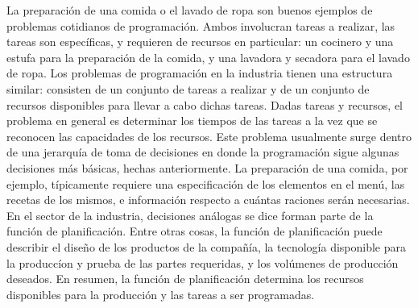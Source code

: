 \documentclass[draft,12pt,headsepline,footsepline,paper=letter]{scrreprt}
\begin{document}
La preparación de una comida o el lavado de ropa son buenos ejemplos de problemas cotidianos de programación. Ambos involucran tareas a realizar, las tareas son específicas, y requieren de recursos en particular: un cocinero y una estufa para la preparación de la comida, y una lavadora y secadora para el lavado de ropa.
Los problemas de programación en la industria tienen una estructura similar: consisten de un conjunto de tareas a realizar y de un conjunto de recursos disponibles para llevar a cabo dichas tareas. Dadas tareas y recursos, el problema en general es determinar los tiempos de las tareas a la vez que se reconocen las capacidades de los recursos.
Este problema usualmente surge dentro de una jerarquía de toma de decisiones en donde la programación sigue algunas decisiones más básicas, hechas anteriormente. La preparación de una comida, por ejemplo, típicamente requiere una especificación de los elementos en el menú, las recetas de los mismos, e información respecto a cuántas raciones serán necesarias. En el sector de la industria, decisiones análogas se dice forman parte de la función de planificación. Entre otras cosas, la función de planificación puede describir el diseño de los productos de la compañía, la tecnología disponible para la produccíon y prueba de las partes requeridas, y los volúmenes de producción deseados. En resumen, la función de planificación determina los recursos disponibles para la producción y las tareas a ser programadas\citep[p.~2]{Baker2009}.
\end{document}
